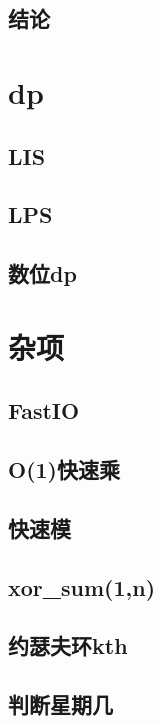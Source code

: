 ﻿\documentclass[a4paper,twocolumn]{article}
\begin{document}
\subsection{结论}
\begin{spacing}{1.5}

\end{spacing}
\section{dp}
\subsection{LIS}

\subsection{LPS}

\subsection{数位dp}

\section{杂项}
\subsection{FastIO}

\subsection{O(1)快速乘}

\subsection{快速模}

\subsection{xor\_sum(1,n)}

\subsection{约瑟夫环kth}

\subsection{判断星期几}

\end{document}
